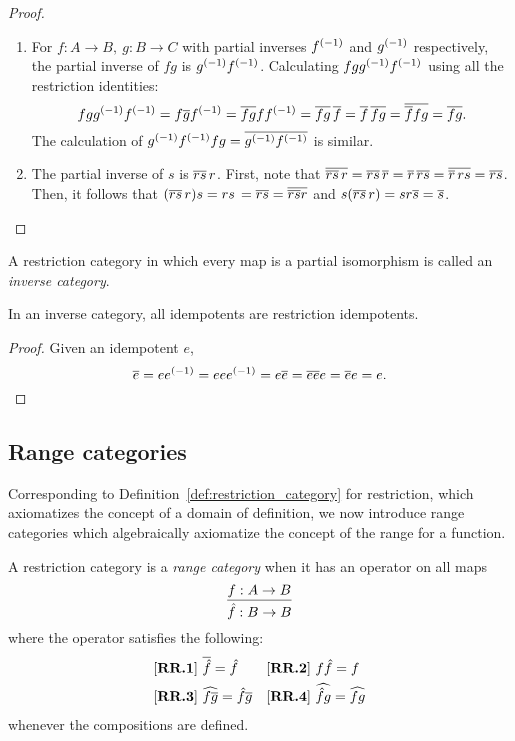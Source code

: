 \begin{proof}
\begin{enumerate}[{(}i{)}]
    \item For $f:A\to B,\ g:B\to C$ with partial inverses ${f}^{(-1)}$ and ${g}^{(-1)}$ respectively,
      the partial inverse of $f g$ is ${g}^{(-1)} {f}^{(-1)}$. Calculating $f g {g}^{(-1)} {f}^{(-1)}$
      using all the restriction identities:
      \[
        f g {g}^{(-1)} {f}^{(-1)} = f \overline{g} {f}^{(-1)} = \overline{f g} f {f}^{(-1)} =
        \overline{f g}\, \overline{f} = \overline{f}\, \overline{f g} = \overline{\overline{f} f g} = \overline{f g}.
      \]
      The calculation of ${g}^{(-1)} {f}^{(-1)} f g = \overline{{g}^{(-1)} {f}^{(-1)}}$ is similar.
    \item The partial inverse of $s$ is $\overline{r s}\,r$. First, note
      that $\overline{\overline{r s}\,r}
      = \overline{r s}\,\overline{r}
      = \overline{r}\, \overline{r s}
      = \overline{\overline{r}\,r s}
      = \overline{r s}$.
      Then, it follows that $(\overline{r s}\,r) s
      = r s\,= \overline{r s}
      = \overline{\overline{r s}r} $ and
      $s (\restr{r s}\,r)
      = s r \restr{s} %
      = \restr{s}$.
  \end{enumerate}
\end{proof}

\begin{definition}\label{def:inverse_category}
  A restriction category in which every map is a partial
  isomorphism is called an \emph{inverse category}.
\end{definition}

\begin{lemma}
  \label{lem:inverse_idempotents_are_restriction_idempotents}
  In an inverse category, all idempotents are restriction idempotents.
\end{lemma}
\begin{proof}
  Given an idempotent $e$,
  \[
    \overline{e} = e{e}^{(-1)} = e e {e}^{(-1)} = e \overline{e} = \overline{e e} e = \overline{e} e = e.
  \]
\end{proof}

\subsection{Range categories} %
\label{sub:range_categories}
Corresponding to Definition~\ref{def:restriction_category} for restriction, which axiomatizes the
concept of a domain of definition, we now introduce range categories which algebraically axiomatize
the concept of the range for a function.

\begin{definition}\label{def:range_category}
  A restriction category \X is a \emph{range category} when it has an operator on all maps
  \[
    \infer{\rg{f}:B\to B}{f:A\to B}
  \]
  where the operator satisfies the following:
  \begin{align*}
    &[\text{\bfseries {RR}.{1}}]\ \overline{\hat{f}} = \hat{f} & &
     [\text{\bfseries {RR}.{2}}]\ f \hat{f} = f\\
    &[\text{\bfseries {RR}.{3}}]\ \widehat{f\overline{g}} = \hat{f} \overline{g} & &
     [\text{\bfseries {RR}.{4}}]\  \widehat{\hat{f}g} = \widehat{f g}
  \end{align*}
  whenever the compositions are defined.

\end{definition}

